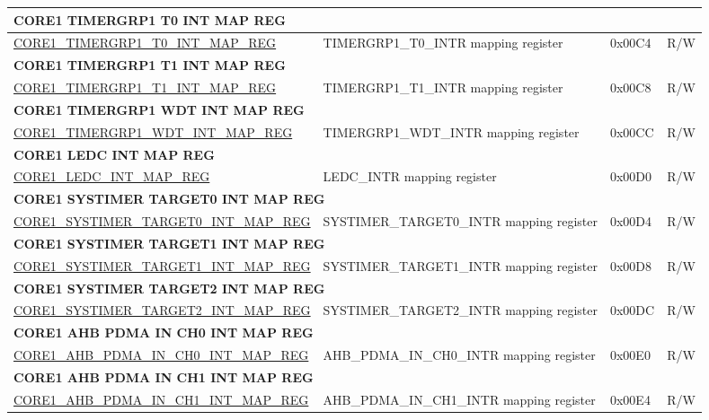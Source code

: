 \begin{longtable}{ | p{7.5cm} | p{7.2cm} | p{1.3cm} | p{1cm} | }
\multicolumn{4}{|l|}{\textbf{CORE1 TIMERGRP1 T0 INT MAP REG}} \\ \hline
\hyperref[regdesc:CORE1TIMERGRP1T0INTMAPREG]{CORE1\_TIMERGRP1\_T0\_INT\_MAP\_REG} & TIMERGRP1\_T0\_INTR mapping register & 0x00C4 & R/W \\ \hline
\multicolumn{4}{|l|}{\textbf{CORE1 TIMERGRP1 T1 INT MAP REG}} \\ \hline
\hyperref[regdesc:CORE1TIMERGRP1T1INTMAPREG]{CORE1\_TIMERGRP1\_T1\_INT\_MAP\_REG} & TIMERGRP1\_T1\_INTR mapping register & 0x00C8 & R/W \\ \hline
\multicolumn{4}{|l|}{\textbf{CORE1 TIMERGRP1 WDT INT MAP REG}} \\ \hline
\hyperref[regdesc:CORE1TIMERGRP1WDTINTMAPREG]{CORE1\_TIMERGRP1\_WDT\_INT\_MAP\_REG} & TIMERGRP1\_WDT\_INTR mapping register & 0x00CC & R/W \\ \hline
\multicolumn{4}{|l|}{\textbf{CORE1 LEDC INT MAP REG}} \\ \hline
\hyperref[regdesc:CORE1LEDCINTMAPREG]{CORE1\_LEDC\_INT\_MAP\_REG} & LEDC\_INTR mapping register & 0x00D0 & R/W \\ \hline
\multicolumn{4}{|l|}{\textbf{CORE1 SYSTIMER TARGET0 INT MAP REG}} \\ \hline
\hyperref[regdesc:CORE1SYSTIMERTARGET0INTMAPREG]{CORE1\_SYSTIMER\_TARGET0\_INT\_MAP\_REG} & SYSTIMER\_TARGET0\_INTR mapping register & 0x00D4 & R/W \\ \hline
\multicolumn{4}{|l|}{\textbf{CORE1 SYSTIMER TARGET1 INT MAP REG}} \\ \hline
\hyperref[regdesc:CORE1SYSTIMERTARGET1INTMAPREG]{CORE1\_SYSTIMER\_TARGET1\_INT\_MAP\_REG} & SYSTIMER\_TARGET1\_INTR mapping register & 0x00D8 & R/W \\ \hline
\multicolumn{4}{|l|}{\textbf{CORE1 SYSTIMER TARGET2 INT MAP REG}} \\ \hline
\hyperref[regdesc:CORE1SYSTIMERTARGET2INTMAPREG]{CORE1\_SYSTIMER\_TARGET2\_INT\_MAP\_REG} & SYSTIMER\_TARGET2\_INTR mapping register & 0x00DC & R/W \\ \hline
\multicolumn{4}{|l|}{\textbf{CORE1 AHB PDMA IN CH0 INT MAP REG}} \\ \hline
\hyperref[regdesc:CORE1AHBPDMAINCH0INTMAPREG]{CORE1\_AHB\_PDMA\_IN\_CH0\_INT\_MAP\_REG} & AHB\_PDMA\_IN\_CH0\_INTR mapping register & 0x00E0 & R/W \\ \hline
\multicolumn{4}{|l|}{\textbf{CORE1 AHB PDMA IN CH1 INT MAP REG}} \\ \hline
\hyperref[regdesc:CORE1AHBPDMAINCH1INTMAPREG]{CORE1\_AHB\_PDMA\_IN\_CH1\_INT\_MAP\_REG} & AHB\_PDMA\_IN\_CH1\_INTR mapping register & 0x00E4 & R/W \\ \hline

\end{longtable}
